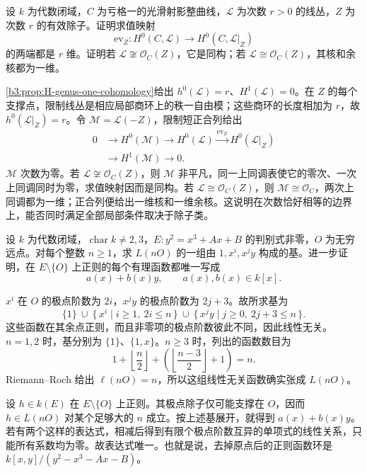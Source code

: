 \begin{exercise}\label{b3:ex:H-genus-one-critical-evaluation}
	设 \(k\) 为代数闭域，\(C\) 为亏格一的光滑射影整曲线，\(\mathcal L\) 为次数 \(r>0\) 的线丛，\(Z\) 为次数 \(r\) 的有效除子。证明求值映射
	\[
		\mathrm{ev}_Z:H^0(C,\mathcal L)\longrightarrow H^0(C,\mathcal L|_Z)
	\]
	的两端都是 \(r\) 维。证明若 \(\mathcal L\not\cong\mathcal O_C(Z)\)，它是同构；若 \(\mathcal L\cong\mathcal O_C(Z)\)，其核和余核都为一维。
\end{exercise}
\begin{solution}
	\cref{b3:prop:H-genus-one-cohomology}给出 \(h^0(\mathcal L)=r\)、\(H^1(\mathcal L)=0\)。在 \(Z\) 的每个支撑点，限制线丛是相应局部商环上的秩一自由模；这些商环的长度相加为 \(r\)，故 \(h^0(\mathcal L|_Z)=r\)。令 \(\mathcal M=\mathcal L(-Z)\)，限制短正合列给出
	\[
		\begin{aligned}
			0&\longrightarrow H^0(\mathcal M)\longrightarrow H^0(\mathcal L)
			\xrightarrow{\mathrm{ev}_Z}H^0(\mathcal L|_Z)\\
			&\longrightarrow H^1(\mathcal M)\longrightarrow0.
		\end{aligned}
	\]
	\(\mathcal M\) 次数为零。若 \(\mathcal L\not\cong\mathcal O_C(Z)\)，则 \(\mathcal M\) 非平凡，同一上同调表使它的零次、一次上同调同时为零，求值映射因而是同构。若 \(\mathcal L\cong\mathcal O_C(Z)\)，则 \(\mathcal M\cong\mathcal O_C\)，两次上同调都为一维；正合列便给出一维核和一维余核。这说明在次数恰好相等的边界上，能否同时满足全部局部条件取决于除子类。
\end{solution}

\begin{exercise}\label{b3:ex:H-pole-basis}
	设 \(k\) 为代数闭域，\(\operatorname{char}k\ne2,3\)，\(E:y^2=x^3+Ax+B\) 的判别式非零，\(O\) 为无穷远点。对每个整数 \(n\ge1\)，求 \(L(nO)\) 的一组由 \(1,x^i,x^jy\) 构成的基。进一步证明，在 \(E\setminus\{O\}\) 上正则的每个有理函数都唯一写成
	\[
		a(x)+b(x)y,\qquad a(x),b(x)\in k[x].
	\]
\end{exercise}
\begin{solution}
	\(x^i\) 在 \(O\) 的极点阶数为 \(2i\)，\(x^jy\) 的极点阶数为 \(2j+3\)。故所求基为
	\[
		\{1\}\ \cup\ \{\,x^i\mid i\ge1,\ 2i\le n\,\}
		\ \cup\ \{\,x^jy\mid j\ge0,\ 2j+3\le n\,\}.
	\]
	这些函数在其余点正则，而且非零项的极点阶数彼此不同，因此线性无关。\(n=1,2\) 时，基分别为 \(\{1\}\)、\(\{1,x\}\)。\(n\ge3\) 时，列出的函数数目为
	\[
		1+\left\lfloor\frac n2\right\rfloor
		+\left(\left\lfloor\frac{n-3}{2}\right\rfloor+1\right)=n.
	\]
	Riemann--Roch 给出 \(\ell(nO)=n\)，所以这组线性无关函数确实张成 \(L(nO)\)。

	设 \(h\in k(E)\) 在 \(E\setminus\{O\}\) 上正则。其极点除子仅可能支撑在 \(O\)，因而 \(h\in L(nO)\) 对某个足够大的 \(n\) 成立。按上述基展开，就得到 \(a(x)+b(x)y\)。若有两个这样的表达式，相减后得到有限个极点阶数互异的单项式的线性关系，只能所有系数均为零。故表达式唯一。也就是说，去掉原点后的正则函数环是 \(k[x,y]/(y^2-x^3-Ax-B)\)。
\end{solution}

